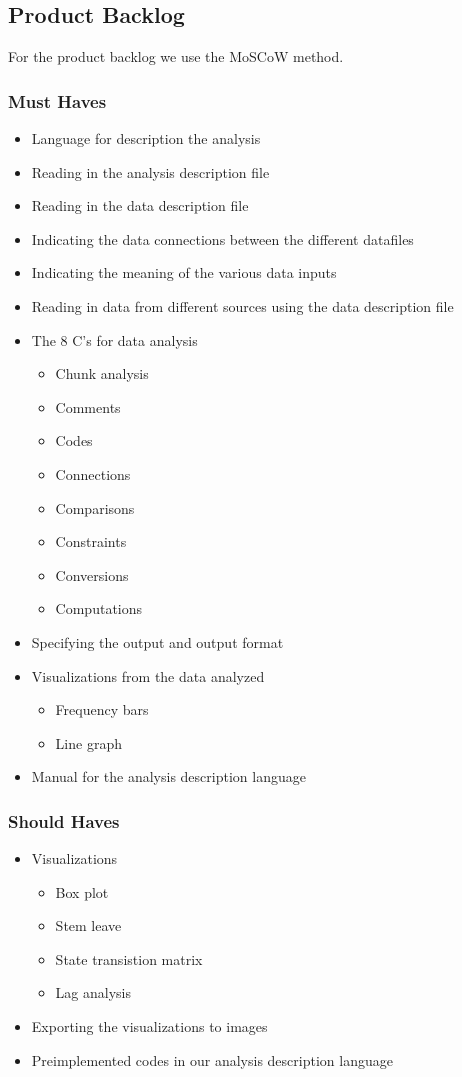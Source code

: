 \subsection{Product Backlog}
For the product backlog we use the MoSCoW method.
\subsubsection{Must Haves}
\begin{itemize}
  \item Language for description the analysis
  \item Reading in the analysis description file
  \item Reading in the data description file
  \item Indicating the data connections between the different datafiles
  \item Indicating the meaning of the various data inputs
  \item Reading in data from different sources using the data description file
  \item The 8 C's for data analysis
  \begin{itemize}
    \item Chunk analysis
    \item Comments
    \item Codes 
    \item Connections
    \item Comparisons
    \item Constraints
    \item Conversions
    \item Computations
  \end{itemize}
  \item Specifying the output and output format
  \item Visualizations from the data analyzed
  \begin{itemize}
  	\item Frequency bars
    \item Line graph
  \end{itemize}
  \item Manual for the analysis description language
\end{itemize}

\subsubsection{Should Haves}
\begin{itemize}
	\item Visualizations
    \begin{itemize}
    	\item Box plot
        \item Stem leave
        \item State transistion matrix
        \item Lag analysis
    \end{itemize}
	\item Exporting the visualizations to images
    \item Preimplemented codes in our analysis description language
\end{itemize}


